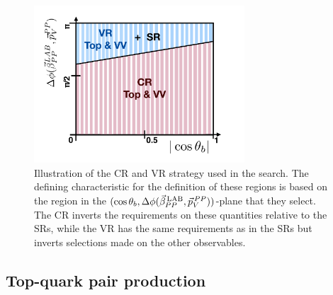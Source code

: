 \begin{figure}[!htb]
    \begin{center}
        \includegraphics[width=0.7\textwidth]{figures/search_stop2l/bkg_est/crvrmotivation}
        \caption{
            Illustration of the CR and VR strategy used in the \bWN search.
            The defining characteristic for the definition of these regions is
            based on the region in the $(\cos\theta_b, \Delta \phi (\vec{\beta}_{PP}^{\,\text{LAB}}, \vec{p}_V^{\,PP}))$-plane that they select.
            The CR inverts the requirements on these quantities relative to the SRs,
            while the VR has the same requirements as in the SRs but inverts
            selections made on the other observables.
        }
        \label{fig:stop_crvr_motivation}
    \end{center}
\end{figure}

\FloatBarrier
%
%

\subsection{Top-quark pair production}
\label{sec:stop_ttbar_estimate}

